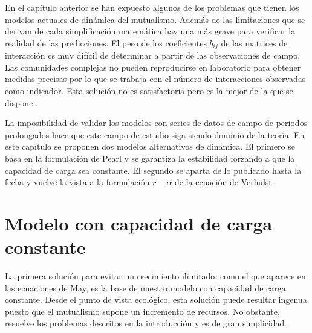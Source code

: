 
En el capítulo anterior se han expuesto algunos de los problemas que tienen los modelos actuales de dinámica del mutualismo. Además de las limitaciones que se derivan de cada simplificación matemática hay una más grave para verificar la realidad de las predicciones. El peso de los coeficientes $b_{ij}$ de las matrices de interacción es muy difícil de determinar a partir de las observaciones de campo. Las comunidades complejas no pueden reproducirse en laboratorio para obtener medidas precisas por lo que se trabaja con el número de interacciones observadas como indicador. Esta solución no es satisfactoria pero es la mejor de la que se dispone \cite{olesen2002geographic}. 

La imposibilidad de validar los modelos con series de datos de campo de periodos prolongados hace que este campo de estudio siga siendo dominio de la teoría. En este capítulo se proponen dos modelos alternativos de dinámica. El primero se basa en la formulación de Pearl y se garantiza la estabilidad forzando a que la capacidad de carga sea constante. El segundo se aparta de lo publicado hasta la fecha y vuelve la vista a la formulación $r-\alpha$ de la ecuación de Verhulst.

\section{Modelo con capacidad de carga constante}

La primera solución para evitar un crecimiento ilimitado, como el que aparece en las ecuaciones de May, es la base de nuestro modelo con capacidad de carga constante. Desde el punto de vista ecológico, esta solución puede resultar ingenua puesto que el mutualismo supone un incremento de recursos. No obstante, resuelve los problemas descritos en la introducción y es de gran simplicidad.

